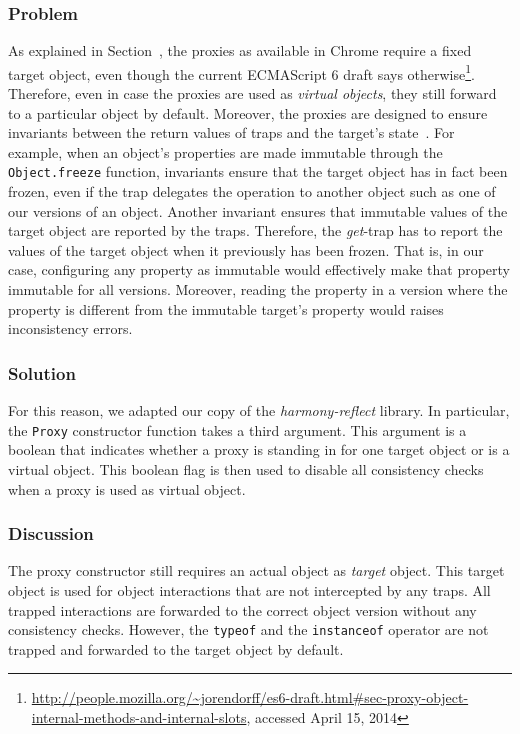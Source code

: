 \subsubsection{Problem}
As explained in Section~\label{subsec:IMPLEMENTATION:1.1}, the proxies as available in Chrome require a fixed target object, even though the current ECMAScript 6 draft says otherwise\footnote{\url{http://people.mozilla.org/~jorendorff/es6-draft.html\#sec-proxy-object-internal-methods-and-internal-slots}, accessed April 15, 2014}.
Therefore, even in case the proxies are used as \emph{virtual objects}, they still forward to a particular object by default.
Moreover, the proxies are designed to ensure invariants between the return values of traps and the target's state~\cite{Cutsem2013TRP}.
For example, when an object's properties are made immutable through the \lstinline{Object.freeze} function, invariants ensure that the target object has in fact been frozen, even if the trap delegates the operation to another object such as one of our versions of an object.
Another invariant ensures that immutable values of the target object are reported by the traps.
Therefore, the \emph{get}-trap has to report the values of the target object when it previously has been frozen.
That is, in our case, configuring any property as immutable would effectively make that property immutable for all versions.
Moreover, reading the property in a version where the property is different from the immutable target's property would raises inconsistency errors.

\subsubsection{Solution}
For this reason, we adapted our copy of the \emph{harmony-reflect} library.
In particular, the \lstinline{Proxy} constructor function takes a third argument.
This argument is a boolean that indicates whether a proxy is standing in for one target object or is a virtual object.
This boolean flag is then used to disable all consistency checks when a proxy is used as virtual object.


\subsubsection{Discussion}

The proxy constructor still requires an actual object as \emph{target} object.
This target object is used for object interactions that are not intercepted by any traps.
All trapped interactions are forwarded to the correct object version without any consistency checks.
However, the \lstinline{typeof} and the \lstinline{instanceof} operator are not trapped and forwarded to the target object by default.

